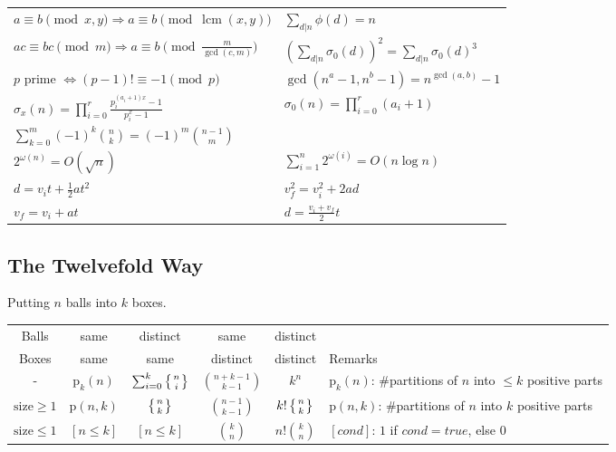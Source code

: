 \documentclass[8pt,a4paper,landscape,oneside]{amsart}
\DeclareMathOperator{\lcm}{lcm}
\begin{document}
\begin{multicols*}{3}
\begin{tabular}{ll}
        $a\equiv b\pmod{x,y} \Rightarrow a\equiv b\pmod{\lcm(x,y)}$ & $\sum_{d|n} \phi(d) = n$ \\
        $ac\equiv bc\pmod{m} \Rightarrow a\equiv b\pmod{\frac{m}{\gcd(c,m)}}$ & $(\sum_{d|n} \sigma_0(d))^2 = \sum_{d|n} \sigma_0(d)^3$ \\
        $p$ prime $\Leftrightarrow (p-1)!\equiv -1\pmod{p}$ & $\gcd(n^a-1,n^b-1) = n^{\gcd(a,b)}-1$ \\
        $\sigma_x(n) = \prod_{i=0}^{r} \frac{p_i^{(a_i + 1)x} - 1}{p_i^x - 1}$ & $\sigma_0(n) = \prod_{i=0}^r (a_i + 1)$ \\
        $\sum_{k=0}^m (-1)^k \binom{n}{k} = (-1)^m \binom{n-1}{m}$ & \\
        $2^{\omega(n)} = O(\sqrt{n})$ & $\sum_{i=1}^n 2^{\omega(i)} = O(n \log n)$ \\
        $d = v_i t + \frac{1}{2}at^2$ & $v_f^2 = v_i^2 + 2ad$ \\
        $v_f = v_i + at$ & $d = \frac{v_i + v_f}{2}t$ \\
    \end{tabular}
    \subsection{The Twelvefold Way}
        Putting $n$ balls into $k$ boxes.\\
    \begin{tabular}{@{}c|c|c|c|c|l@{}}
    Balls & same & distinct & same & distinct & \\
    Boxes & same & same & distinct & distinct & Remarks\\
    \hline
    - & $\mathrm{p}_k(n)$ & $\sum_{i=0}^k \left\{{n\atop i}\right\}$ & $\binom{n+k-1}{k-1}$ & $k^n$ & $\mathrm{p}_k(n)$: \#partitions of $n$ into $\le k$ positive parts \\
    $\mathrm{size}\ge 1$ & $\mathrm{p}(n,k)$ & $\left\{{n\atop k}\right\}$ & $\binom{n-1}{k-1}$ & $k!\left\{{n\atop k}\right\}$ & $\mathrm{p}(n,k)$: \#partitions of $n$ into $k$ positive parts \\
    $\mathrm{size}\le 1$ & $[n \le k]$ & $[n \le k]$ & $\binom{k}{n}$ & $n!\binom{k}{n}$ & $[cond]$: $1$ if $cond=true$, else $0$\\
    \bottomrule
    \end{tabular}

\end{multicols*}
\end{document}
